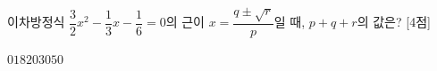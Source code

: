 이차방정식 $\dfrac{3}{2}x^2-\dfrac{1}{3}x-\dfrac{1}{6}=0$의 근이 $x=\dfrac{q\pm\sqrt{r}}{p}$일 때, $p+q+r$의 값은?  \mbox{[4점]}
\begin{choices32}{$0$}{$18$}{$20$}{$30$}{$50$}\end{choices32}

